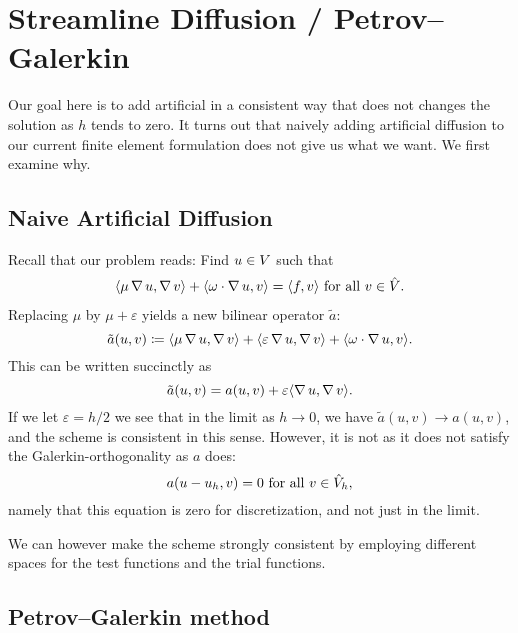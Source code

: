 \section{Streamline Diffusion / Petrov--Galerkin}
\label{sec:streamline_diffusion_petrov_galerkin}

Our goal here is to add artificial in a consistent way that does not changes
the solution as \( h \) tends to zero. It turns out that naively adding
artificial diffusion to our current finite element formulation does not give us
what we want. We first examine why. 

\subsection{Naive Artificial Diffusion}
\label{sub:naive_artificial_diffusion}

Recall that our problem reads: Find \( u \in V\) such that
\begin{align}
    \langle \mu \operatorname{\mathop{}\!\nabla} u, \operatorname{\mathop{}\!\nabla} v \rangle + \langle \omega \cdot \operatorname{\mathop{}\!\nabla} u, v
    \rangle = \langle f, v \rangle \text{ for all } v \in \hat{V}.
\end{align}
Replacing \( \mu \) by \( \mu + \varepsilon \) yields a new bilinear operator \( \tilde{a} \):
\begin{equation}
    \tilde{a}(u, v) \coloneqq \langle \mu \operatorname{\mathop{}\!\nabla} u, \operatorname{\mathop{}\!\nabla} v \rangle + \langle
    \varepsilon \operatorname{\mathop{}\!\nabla} u, \operatorname{\mathop{}\!\nabla} v \rangle + \langle \omega \cdot \operatorname{\mathop{}\!\nabla} u, v
\rangle.
\end{equation}
This can be written succinctly as 
\begin{equation}
    \tilde{a}(u, v) = a(u, v) + \varepsilon \langle \operatorname{\mathop{}\!\nabla} u, \operatorname{\mathop{}\!\nabla} v\rangle.
\end{equation}
If we let \( \varepsilon = h / 2 \) we see that in the limit as \( h \to 0 \),
we have \( \tilde{a}(u, v) \to a(u, v) \), and the scheme is consistent in this
sense. However, it is not  as it does not satisfy
the Galerkin-orthogonality as \( a \) does: 
\begin{equation}
    a(u - u_h, v) = 0 \text{ for all } v \in \hat{V}_h,
\end{equation}
namely that this equation is zero for  discretization, and not just
in the limit.

We can however make the scheme strongly consistent by employing different
spaces for the test functions and the trial functions.

\subsection{Petrov--Galerkin method}

